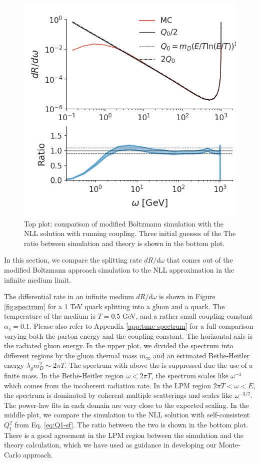 \documentclass[aps, prc, reprint, amsmath, groupedaddress, nofootinbib]{revtex4-1}
\begin{document}
\begin{figure}
\includegraphics[width=\columnwidth]{running.png}
\caption{Top plot: comparison of modified Boltzmann simulation with the NLL solution  with running coupling.
Three initial guesses of the 
The ratio between simulation and theory is shown in the bottom plot.}
\label{fig:running}
\end{figure}

In this section, we compare the splitting rate $dR/d\omega$ that comes out of the modified Boltzmann approach simulation to the NLL approximation in the infinite medium limit.

The differential rate in an infinite medium $dR/d\omega$ is shown in Figure \ref{fig:spectrum} for a 1 TeV quark splitting into a gluon and a quark.
The temperature of the medium is $T=0.5$ GeV, and a rather small coupling constant $\alpha_s = 0.1$.
Please also refer to Appendix \ref{app:tune-spectrum} for a full comparison varying both the parton energy and the coupling constant.
The horizontal axis is the radiated gluon energy.
In the upper plot, we divided the spectrum into different regions by the gluon thermal mass $m_\infty$ and an estimated Bethe-Heitler energy $\lambda_g m_D^2 \sim 2\pi T$.
The spectrum with above the is suppressed due the use of a finite mass.
In the Bethe-Heitler region $\omega < 2\pi T$, the spectrum scales like $\omega^{-1}$ which comes from the incoherent radiation rate.
In the LPM region $2\pi T < \omega < E$, the spectrum is dominated by coherent multiple scatterings and scales like $\omega^{-3/2}$.
The power-law fits in each domain are very close to the expected scaling.
In the middle plot, we compare the simulation to the NLL solution with self-consistent $Q_1^2$ from Eq. \ref{eq:Q1-sf}. 
The ratio between the two is shown in the bottom plot.
There is a good agreement in the LPM region between the simulation and the theory calculation, which we have used as guidance in developing our Monte-Carlo approach.
\end{document}
